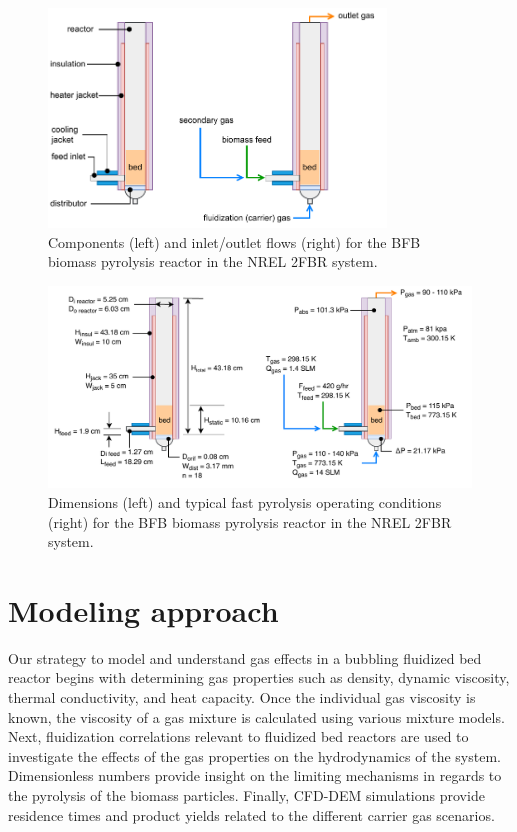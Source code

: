 \documentclass{article}
\begin{document}
\begin{figure}[H]
    \centering
    \includegraphics[width=0.8\textwidth]{pyrolyzer-components.pdf}
    \caption{Components (left) and inlet/outlet flows (right) for the BFB biomass pyrolysis reactor in the NREL 2FBR system.}
    \label{fig:pyrolyzer-components}
\end{figure}

\begin{figure}[H]
    \centering
    \includegraphics[width=\textwidth]{pyrolyzer-dims-flows.pdf}
    \caption{Dimensions (left) and typical fast pyrolysis operating conditions (right) for the BFB biomass pyrolysis reactor in the NREL 2FBR system.}
    \label{fig:pyrolyzer-dims-flows}
\end{figure}


\section{Modeling approach}

Our strategy to model and understand gas effects in a bubbling fluidized bed reactor begins with determining gas properties such as density, dynamic viscosity, thermal conductivity, and heat capacity. Once the individual gas viscosity is known, the viscosity of a gas mixture is calculated using various mixture models. Next, fluidization correlations relevant to fluidized bed reactors are used to investigate the effects of the gas properties on the hydrodynamics of the system. Dimensionless numbers provide insight on the limiting mechanisms in regards to the pyrolysis of the biomass particles. Finally, CFD-DEM simulations provide residence times and product yields related to the different carrier gas scenarios.
\end{document}
